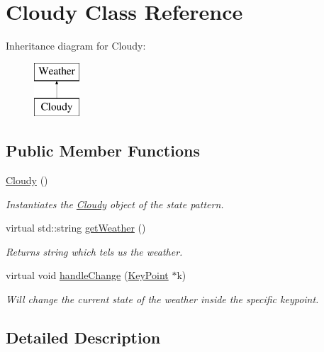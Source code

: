 \hypertarget{classCloudy}{}\section{Cloudy Class Reference}
\label{classCloudy}
Inheritance diagram for Cloudy\+:\begin{figure}[H]
\begin{center}
\leavevmode
\includegraphics[height=2.000000cm]{classCloudy}
\end{center}
\end{figure}
\subsection*{Public Member Functions}
\begin{DoxyCompactItemize}
\item 
\mbox{\label{classCloudy_a343d3f7df85d665400b9c945e1d70e9f}} 
\hyperlink{classCloudy_a343d3f7df85d665400b9c945e1d70e9f}{Cloudy} ()
\begin{DoxyCompactList}\small\item\em Instantiates the \hyperlink{classCloudy}{Cloudy} object of the state pattern. \end{DoxyCompactList}\item 
virtual std\+::string \hyperlink{classCloudy_a4570dd10132fac93ec1123aad0f5c883}{get\+Weather} ()
\begin{DoxyCompactList}\small\item\em Returns string which tels us the weather. \end{DoxyCompactList}\item 
virtual void \hyperlink{classCloudy_ad76de74d84d8bc7c070ff1a9dc935600}{handle\+Change} (\hyperlink{classKeyPoint}{Key\+Point} $\ast$k)
\begin{DoxyCompactList}\small\item\em Will change the current state of the weather inside the specific keypoint. \end{DoxyCompactList}\end{DoxyCompactItemize}


\subsection{Detailed Description}


